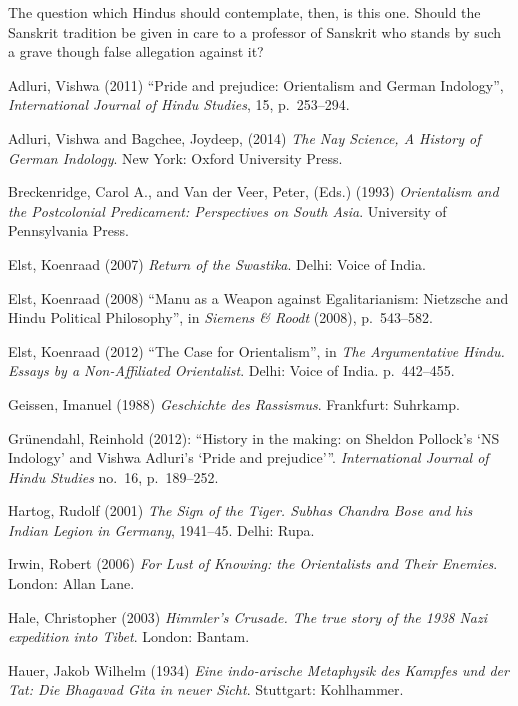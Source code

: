 The question which Hindus should contemplate, then, is this one. Should the Sanskrit tradition be given in care to a professor of Sanskrit who stands by such a grave though false allegation against it?

\newpage

\begin{thebibliography}{99}
\itemsep=2pt
Adluri, Vishwa (2011) “Pride and prejudice: Orientalism and German Indology”, {\sl International Journal of Hindu Studies}, 15, p.~253--294.

Adluri, Vishwa and Bagchee, Joydeep, (2014) {\sl The Nay Science, A History of German Indology}. New York: Oxford University Press.

Breckenridge, Carol A., and Van der Veer, Peter, (Eds.) (1993) {\sl Orientalism and the Postcolonial Predicament: Perspectives on South Asia}. University of Pennsylvania Press.

Elst, Koenraad (2007) {\sl Return of the Swastika}.  Delhi: Voice of India.

Elst, Koenraad (2008) “Manu as a Weapon against Egalitarianism: Nietzsche and Hindu Political Philosophy”, in {\sl Siemens \& Roodt} (2008), p.~543--582.

Elst, Koenraad (2012) “The Case for Orientalism”, in {\sl The Argumentative Hindu. Essays by a Non-Affiliated Orientalist}. Delhi: Voice of India. p.~442--455.

Geissen, Imanuel (1988) {\sl Geschichte des Rassismus}. Frankfurt: Suhrkamp.

Grünendahl, Reinhold (2012): “History in the making: on Sheldon Pollock’s ‘NS Indology’ and Vishwa Adluri’s ‘Pride and prejudice’”. 
{\sl International Journal of Hindu Studies} no.~16, p.~189--252.

Hartog, Rudolf (2001) {\sl The Sign of the Tiger. Subhas Chandra Bose and his Indian Legion in Germany}, 1941--45. Delhi: Rupa.

Irwin, Robert (2006) {\sl For Lust of Knowing: the Orientalists and Their Enemies}. London: Allan Lane.

Hale, Christopher (2003) {\sl Himmler’s Crusade. The true story of the 1938 Nazi expedition into Tibet}. London: Bantam.

Hauer, Jakob Wilhelm (1934) {\sl Eine indo-arische Metaphysik des Kampfes und der Tat: Die Bhagavad Gita in neuer Sicht}. Stuttgart: Kohlhammer.


\end{thebibliography}
